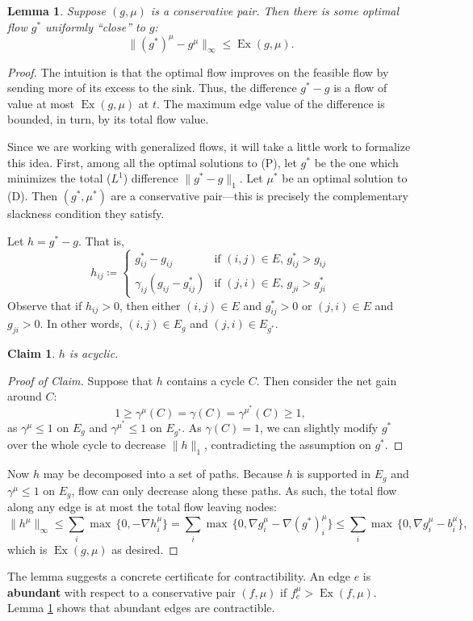 \documentclass[11pt]{article}
\newtheorem{lemma}[theorem]{Lemma}
\newtheorem{claim}[theorem]{Claim}
\theoremstyle{definition}
\theoremstyle{definition}
\theoremstyle{definition}
\newcommand{\biu}{b_{i}^{\mu}}
\newcommand{\gij}{\gamma_{ij}}
\DeclareMathOperator{\Ex}{Ex}
\begin{document}
	\begin{lemma} \label{lem.bound-dist}
	Suppose $(g, \mu)$ is a conservative pair. Then there is some optimal flow $g^*$
    uniformly ``close'' to $g$:
    \[ \|(g^*)^\mu - g^\mu\|_\infty \leq \Ex(g, \mu). \]
    \end{lemma}
    \begin{proof}
    The intuition is that the optimal flow improves on the feasible flow by
    sending more of its excess to the sink. Thus, the difference $g^* - g$
    is a flow of value at most $\Ex(g, \mu)$ at $t$. The maximum edge value of
    the difference is bounded, in turn, by its total flow value.
    
	Since we are working with generalized flows, it will take a little work to formalize
	this idea. First, among all the optimal solutions to (P), let $g^*$ be the one
	which minimizes the total ($L^1$) difference $\|g^* - g\|_1$. Let $\mu^*$ be an
	optimal solution to (D). Then $(g^*, \mu^*)$ are a conservative pair---this is precisely
	the complementary slackness condition they satisfy.
	
	Let $h = g^* - g$. That is,
	\[ h_{ij} \coloneqq \begin{cases}
							g^*_{ij} - g_{ij} & \text{if } (i, j) \in E, \,
														   g^*_{ij} > g_{ij} \\
							\gij(g_{ij} - g^*_{ij}) & \text{if } (j, i) \in E, \,
																 g_{ji} > g^*_{ji}
						\end{cases} \]
    Observe that if $h_{ij} > 0$, then either $(i, j) \in E$ and $g^*_{ij} > 0$ or
    $(j, i) \in E$ and $g_{ji} > 0$. In other words,
    $(i, j) \in E_g$ and $(j, i) \in E_{g^*}$.
    
    \begin{claim} \label{claim:nocycles} $h$ is acyclic. \end{claim}
    \begin{proof}[Proof of Claim]
    Suppose that $h$ contains a cycle $C$. Then consider the net gain around $C$:
    \[ 1 \geq \gamma^\mu(C) = \gamma(C) = \gamma^{\mu^*}(C) \geq 1, \]
    as $\gamma^\mu \leq 1$ on $E_g$ and $\gamma^{\mu^*} \leq 1$ on $E_{g^*}$.
    As $\gamma(C) = 1$, we can slightly modify $g^*$ over the whole cycle to
    decrease $\|h\|_1$, contradicting the assumption on $g^*$.
    \end{proof}
    
    Now $h$ may be decomposed into a set of paths. Because $h$ is supported in $E_g$ and
    $\gamma^\mu \leq 1$ on $E_g$, flow can only decrease along these paths.
    As such, the total flow along any edge is at most the total flow leaving nodes:
    \[ \|h^\mu\|_\infty \leq \sum_i \max\,\{0, -\nabla h_i^\mu\}
     = \sum_i \max\,\{0, \nabla g_i^\mu - \nabla (g^*)_i^\mu\}
     \leq \sum_i \max\,\{0, \nabla g_i^\mu - \biu \}, \]
     which is $\Ex(g, \mu)$ as desired.
    \end{proof}
    The lemma suggests a concrete certificate for contractibility. An edge $e$ is
    \textbf{abundant} with respect to a conservative pair $(f, \mu)$
    if $f^\mu_e > \Ex(f, \mu)$.
    Lemma \ref{lem.bound-dist} shows that abundant edges are contractible.
    
\end{document}
